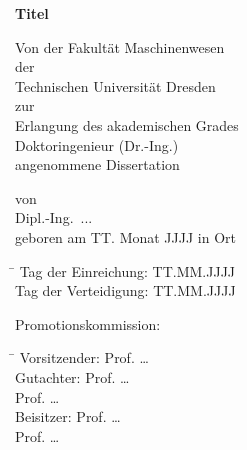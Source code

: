 \begin{titlepage}

\centering
\vspace*{-2.0cm}

{\renewcommand{\baselinestretch}{1.4}\LARGE
{\textbf{Titel}}\par
}

\vspace{1cm}

Von der Fakultät Maschinenwesen \\[+0.5\baselineskip]
der\\[+0.5\baselineskip]
Technischen Universität Dresden \\[+0.5\baselineskip]
zur\\[+0.5\baselineskip]
Erlangung des akademischen Grades \\[+0.5\baselineskip]
Doktoringenieur (Dr.-Ing.) \\[+0.5\baselineskip]
angenommene Dissertation

\vspace{1cm}

von \\[+0.5\baselineskip]
{\large Dipl.-Ing.\ ...} \\[+0.5\baselineskip]
geboren am TT. Monat JJJJ in Ort \\

\vspace{1cm}

\begin{tabbing}
\hspace*{4.3cm}\= \kill
Tag der Einreichung: \> TT.MM.JJJJ \\
Tag der Verteidigung: \> TT.MM.JJJJ 
\end{tabbing}

\vspace{1cm}

\raggedright
Promotionskommission:
\begin{tabbing}
\hspace*{2.8cm}\= \kill
Vorsitzender: \> Prof. \dots \\[+0.5\baselineskip]
Gutachter:    \> Prof. \dots \\
							\> Prof. \dots \\[+0.5\baselineskip]
Beisitzer: 		\> Prof. \dots \\
							\> Prof. \dots \\
\end{tabbing}
\end{titlepage}

